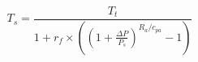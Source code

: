 \[
T_s = \frac{T_t}
     {1 + r_f\times \left( \left(1 + \frac{\Delta P}{P_s}\right)
        ^{R_a/c_{pa}} - 1\right)}
\]
